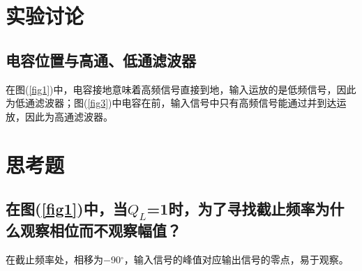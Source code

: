 \documentclass[a4paper]{article}
\begin{document}
\section{实验讨论}
\subsection{电容位置与高通、低通滤波器}
在图(\ref{fig1})中，电容接地意味着高频信号直接到地，输入运放的是低频信号，因此为低通滤波器；图(\ref{fig3})中电容在前，输入信号中只有高频信号能通过并到达运放，因此为高通滤波器。

\section{思考题}

\subsection{在图(\ref{fig1})中，当$Q_L$=1时，为了寻找截止频率为什么观察相位而不观察幅值？}
在截止频率处，相移为$-$90$^{\circ}$，输入信号的峰值对应输出信号的零点，易于观察。

\nocite{jiaocai}

\end{document}
